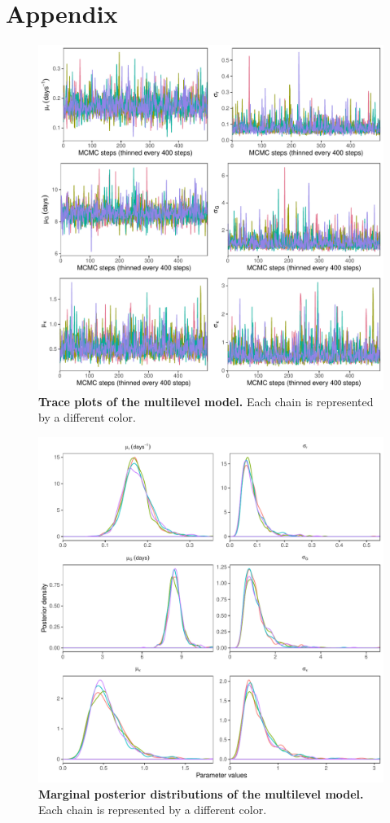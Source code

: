 \documentclass[12pt]{article}
\begin{document}
\pagebreak



\pagebreak
\appendix
\renewcommand\thefigure{A\arabic{figure}}
\setcounter{figure}{0}    
\section*{Appendix}

\begin{figure}[!h]
\includegraphics[width=\textwidth]{posterior_chain.pdf}
\caption{
\textbf{Trace plots of the multilevel model.}
Each chain is represented by a different color.
}
\end{figure}

\pagebreak

\begin{figure}[!h]
\includegraphics[width=\textwidth]{posterior_dist.pdf}
\caption{
\textbf{Marginal posterior distributions of the multilevel model.}
Each chain is represented by a different color.
}
\end{figure}
\end{document}
